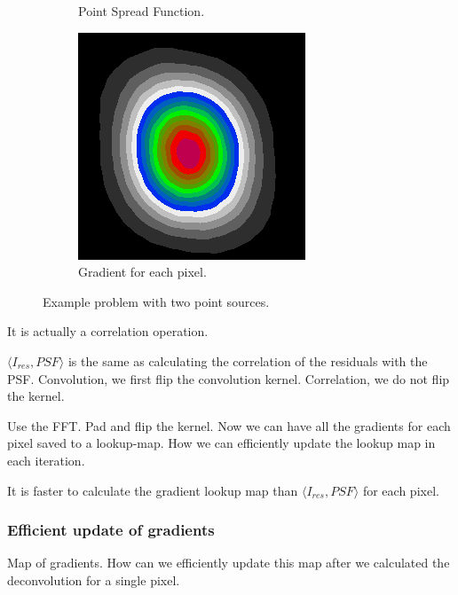 \begin{figure}[h]
\begin{subfigure}[b]{0.3\linewidth}
		\caption{Point Spread Function.}
		\label{cd:efficient:gradients:psf}
	\end{subfigure}
	\begin{subfigure}[b]{0.3\linewidth}
		\includegraphics[width=\linewidth]{./chapters/03.distribution/simulated/gradients.png}
		\caption{Gradient for each pixel.}
		\label{cd:efficient:gradients:gradients}
	\end{subfigure}
	
	\caption{Example problem with two point sources.}
	\label{cd:efficient:gradients:figure}
\end{figure}

It is actually a correlation operation.

$\langle I_{res},PSF\rangle$ is the same as calculating the correlation of the residuals with the PSF.
Convolution, we first flip the convolution kernel.
Correlation, we do not flip the kernel.

Use the FFT. Pad and flip the kernel. Now we can have all the gradients for each pixel saved to a lookup-map. How we can efficiently update the lookup map in each iteration.

It is faster to calculate the gradient lookup map than $\langle I_{res},PSF\rangle$ for each pixel.

\subsubsection{Efficient update of gradients}
Map of gradients. How can we efficiently update this map after we calculated the deconvolution for a single pixel.




